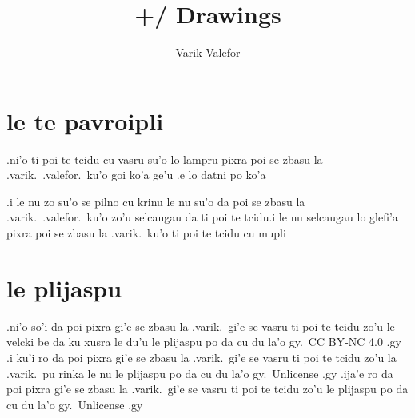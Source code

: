 \documentclass{report}
\title{+/ Drawings}
\author{Varik Valefor}
\begin{document}
\maketitle{}
\tableofcontents{}
\chapter{le te pavroipli}
.ni'o ti poi te tcidu cu vasru su'o lo lampru pixra poi se zbasu la .varik.\ .valefor.\ ku'o goi ko'a ge'u .e lo datni po ko'a

.i le nu zo su'o se pilno cu krinu le nu su'o da poi se zbasu la .varik.\ .valefor.\ ku'o zo'u selcaugau da ti poi te tcidu\@  .i le nu selcaugau lo glefi'a pixra poi se zbasu la .varik.\ ku'o ti poi te tcidu cu mupli

\chapter{le plijaspu}
.ni'o so'i da poi pixra gi'e se zbasu la .varik.\ gi'e se vasru ti poi te tcidu zo'u le velcki be da ku xusra le du'u le plijaspu po da cu du la'o gy.\ CC BY-NC 4.0 .gy  .i ku'i ro da poi pixra gi'e se zbasu la .varik.\ gi'e se vasru ti poi te tcidu zo'u la .varik.\ pu rinka le nu le plijaspu po da cu du la'o gy.\ Unlicense .gy  .ija'e ro da poi pixra gi'e se zbasu la .varik.\ gi'e se vasru ti poi te tcidu zo'u le plijaspu po da cu du la'o gy.\ Unlicense .gy
\end{document}
